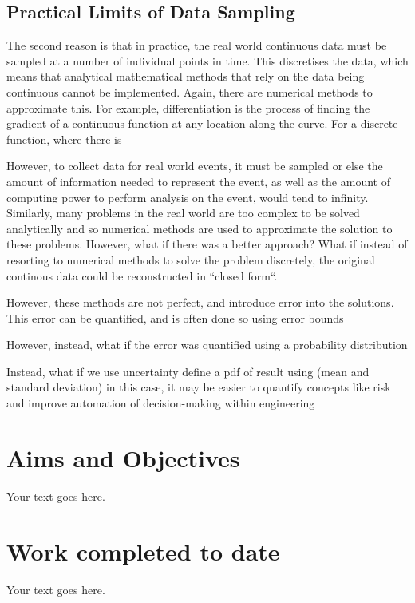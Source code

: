 \documentclass[12pt]{article}
\begin{document}
    \subsection{Practical Limits of Data Sampling}
    The second reason is that in practice, the real world continuous data must be sampled at a number of individual points in time.
    This discretises the data, which means that analytical mathematical methods that rely on the data being continuous cannot be implemented.
    Again, there are numerical methods to approximate this.
    For example, differentiation is the process of finding the gradient of a continuous function at any location along the curve.
    For a discrete function, where there is




    However, to collect data for real world events, it must be sampled or else the amount of information needed to represent the event, as well as the amount of computing power to perform analysis on the event, would tend to infinity.
    Similarly, many problems in the real world are too complex to be solved analytically and so numerical methods are used to approximate the solution to these problems.
    However, what if there was a better approach?
    What if instead of resorting to numerical methods to solve the problem discretely, the original continous data could be reconstructed in ``closed form``.

        However, these methods are not perfect, and introduce error into the solutions.
        This error can be quantified, and is often done so using error bounds


    However, instead, what if the error was quantified using a probability distribution

    Instead, what if we use uncertainty define a pdf of result using (mean and standard deviation)
    in this case, it may be easier to quantify concepts like risk and improve automation of decision-making within engineering
    \subsection{}

    \section{Aims and Objectives}
    Your text goes here.

    \section{Work completed to date}
    Your text goes here. \cite{q-candela}
\end{document}
